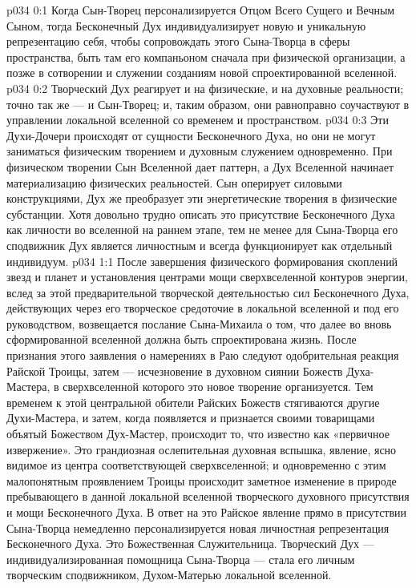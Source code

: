 \author{Могучий Вестник}
\vs p034 0:1 Когда Сын\hyp{}Творец персонализируется Отцом Всего Сущего и Вечным Сыном, тогда Бесконечный Дух индивидуализирует новую и уникальную репрезентацию себя, чтобы сопровождать этого Сына\hyp{}Творца в сферы пространства, быть там его компаньоном сначала при физической организации, а позже в сотворении и служении созданиям новой спроектированной вселенной.
\vs p034 0:2 Творческий Дух реагирует и на физические, и на духовные реальности; точно так же --- и Сын\hyp{}Творец; и, таким образом, они равноправно соучаствуют в управлении локальной вселенной со временем и пространством.
\vs p034 0:3 Эти Духи\hyp{}Дочери происходят от сущности Бесконечного Духа, но они не могут заниматься физическим творением и духовным служением одновременно. При физическом творении Сын Вселенной дает паттерн, а Дух Вселенной начинает материализацию физических реальностей. Сын оперирует силовыми конструкциями, Дух же преобразует эти энергетические творения в физические субстанции. Хотя довольно трудно описать это присутствие Бесконечного Духа как личности во вселенной на раннем этапе, тем не менее для Сына\hyp{}Творца его сподвижник Дух является личностным и всегда функционирует как отдельный индивидуум.
\vs p034 1:1 После завершения физического формирования скоплений звезд и планет и установления центрами мощи сверхвселенной контуров энергии, вслед за этой предварительной творческой деятельностью сил Бесконечного Духа, действующих через его творческое средоточие в локальной вселенной и под его руководством, возвещается послание Сына\hyp{}Михаила о том, что далее во вновь сформированной вселенной должна быть спроектирована жизнь. После признания этого заявления о намерениях в Раю следуют одобрительная реакция Райской Троицы, затем --- исчезновение в духовном сиянии Божеств Духа\hyp{}Мастера, в сверхвселенной которого это новое творение организуется. Тем временем к этой центральной обители Райских Божеств стягиваются другие Духи\hyp{}Мастера, и затем, когда появляется и признается своими товарищами объятый Божеством Дух\hyp{}Мастер, происходит то, что известно как «первичное извержение». Это грандиозная ослепительная духовная вспышка, явление, ясно видимое из центра соответствующей сверхвселенной; и одновременно с этим малопонятным проявлением Троицы происходит заметное изменение в природе пребывающего в данной локальной вселенной творческого духовного присутствия и мощи Бесконечного Духа. В ответ на это Райское явление прямо в присутствии Сына\hyp{}Творца немедленно персонализируется новая личностная репрезентация Бесконечного Духа. Это Божественная Служительница. Творческий Дух --- индивидуализированная помощница Сына\hyp{}Творца --- стала его личным творческим сподвижником, Духом\hyp{}Матерью локальной вселенной.
